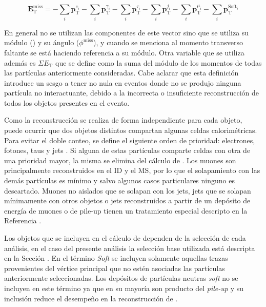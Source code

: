 \begin{equation}
\textbf{E}_{\text{T}}^{\text{miss}} = -\sum_{i}\textbf{p}_{\text{T}}^{e_i}-\sum_{i}\textbf{p}_{\text{T}}^{\gamma_i}-\sum_{i}\textbf{p}_{\text{T}}^{\tau_i}-\sum_{i}\textbf{p}_{\text{T}}^{j_i}-\sum_{i}\textbf{p}_{\text{T}}^{\mu_i}-\sum_{i}\textbf{p}_{\text{T}}^{\text{Soft}_i}
\end{equation}


En general no se utilizan las componentes de este vector sino que se utiliza su módulo (\met) y su ángulo ($\phi^{\text{miss}}$), y cuando se menciona al momento transverso faltante se está haciendo referencia a su módulo. Otra variable que se utiliza además es $\Sigma E_{\text{T}}$ que se define como la suma del módulo de los momentos de todas las partículas anteriormente consideradas. Cabe aclarar que esta definición introduce un sesgo a tener \met no nula en eventos donde no se produjo ninguna partícula no interactuante, debido a la incorrecta o insuficiente reconstrucción de todos los objetos presentes en el evento.

Como la reconstrucción se realiza de forma independiente para cada objeto, puede ocurrir que dos objetos distintos compartan algunas celdas calorimétricas. Para evitar el doble conteo, se define el siguiente orden de prioridad: electrones, fotones, taus y jets \cite{PERF-2011-07, PERF-2014-04}. Si alguna de estas partículas comparte celdas con otra de una prioridad mayor, la misma se elimina del cálculo de \met. Los muones son principalmente reconstruidos en el ID y el MS, por lo que el solapamiento con las demás partículas es mínimo y salvo algunos casos particulares ninguno es descartado. Muones no aislados que se solapan con los jets, jets que se solapan mínimamente con otros objetos o jets reconstruidos a partir de un depósito de energía de muones o de pile-up tienen un tratamiento especial descripto en la Referencia \cite{PERF-2016-07}.

Los objetos que se incluyen en el cálculo de \met dependen de la selección de cada análisis, en el caso del presente análisis la selección base utilizada está descripta en la Sección . En el término \textit{Soft} se incluyen solamente aquellas trazas provenientes del vértice principal que no estén asociadas las partículas anteriormente seleccionadas. Los depósitos de partículas neutras \textit{soft} no se incluyen en este término ya que en su mayoría son producto del \textit{pile-up} y su inclusión reduce el desempeño en la reconstrucción de \met.


